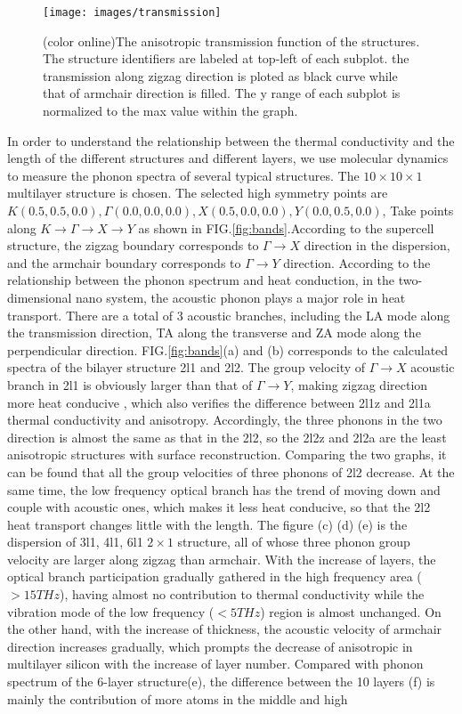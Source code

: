 \documentclass[%
 reprint,
 amsmath,amssymb,
 aps,
 prb,
]{revtex4-1}
\begin{document}
\begin{figure}[b]
\texttt{[image: images/transmission]}
\caption{\label{fig:transmission} (color online)The anisotropic transmission function of the structures. The structure identifiers are labeled at top-left of each subplot. the transmission along zigzag direction is ploted as black curve while that of armchair direction is filled. The y range of each subplot is normalized to the max value within the graph.}
\end{figure}

In order to understand the relationship between the thermal conductivity and the length of the different structures and different layers, we use molecular dynamics to measure the phonon spectra of several typical structures. The $10 \times  10  \times  1$ multilayer structure is chosen. The selected high symmetry points are $K(0.5, 0.5, 0.0) , \Gamma(0.0, 0.0, 0.0), X(0.5, 0.0, 0.0),  Y(0.0, 0.5, 0.0)$, Take points along $ K \rightarrow \Gamma \rightarrow X\rightarrow Y$ as shown in FIG.\ref{fig:bands}.According to the supercell structure, the zigzag boundary corresponds to $ \Gamma \rightarrow X$ direction in the dispersion, and the armchair boundary corresponds to $\Gamma\rightarrow Y$ direction. According to the relationship between the phonon spectrum and heat conduction, in the two-dimensional nano system, the acoustic phonon plays a major role in heat transport. There are a total of 3 acoustic branches, including the LA mode along the transmission direction, TA along the transverse and ZA mode along the perpendicular direction. FIG.\ref{fig:bands}(a) and (b) corresponds to the calculated spectra of the bilayer structure 2l1 and 2l2. The group velocity of $\Gamma\rightarrow X$ acoustic branch in 2l1 is obviously larger than that of $\Gamma\rightarrow Y$, making zigzag direction more heat conducive , which also verifies the difference between 2l1z and 2l1a thermal conductivity and anisotropy. Accordingly, the three phonons in the two direction is almost the same as that in the 2l2, so the 2l2z and 2l2a are the least anisotropic structures with surface reconstruction. Comparing the two graphs, it can be found that all the group velocities of three phonons of 2l2 decrease. At the same time, the low frequency optical branch has the trend of moving down and couple with acoustic ones, which makes it less heat conducive, so that the 2l2 heat transport changes little with the length. The figure (c) (d) (e) is the dispersion of 3l1, 4l1, 6l1 $2 \times 1$ structure, all of whose three phonon group velocity are larger along zigzag than armchair. With the increase of layers, the optical branch participation gradually gathered in the high frequency area ($>15THz$), having almost no contribution to thermal conductivity while the vibration mode of the low frequency ($<5THz$) region is almost unchanged. On the other hand, with the increase of thickness, the acoustic velocity of armchair direction increases gradually, which prompts the decrease of anisotropic in multilayer silicon with the increase of layer number. Compared with phonon spectrum of the 6-layer structure(e), the difference between the 10 layers (f) is mainly the contribution of more atoms in the middle and high 
\end{document}
